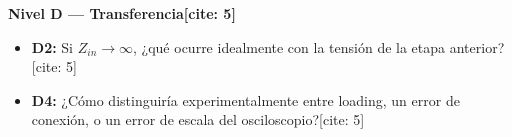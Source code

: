 \documentclass[11pt, a4paper]{article}
\begin{document}
\textbf{Nivel D — Transferencia[cite: 5]}
\begin{itemize}
    \item \textbf{D2:} Si $Z_{in} \rightarrow \infty$, ¿qué ocurre idealmente con la tensión de la etapa anterior?[cite: 5]
    \item \textbf{D4:} ¿Cómo distinguiría experimentalmente entre loading, un error de conexión, o un error de escala del osciloscopio?[cite: 5]
\end{itemize}
\end{document}
